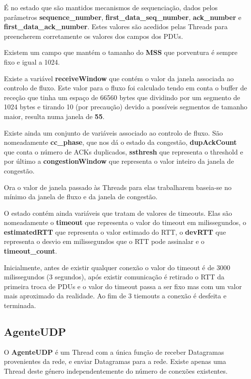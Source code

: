 \documentclass{llncs}
\begin{document}
É no estado que são mantidos mecanismos de sequenciação, dados pelos parâmetros \textbf{sequence\_number}, \textbf{first\_data\_seq\_number}, \textbf{ack\_number} e \textbf{first\_data\_ack\_number}. Estes valores são acedidos pelas Threads para preencherem corretamente os valores dos campos dos PDUs.

Existem um campo que mantém o tamanho do \textbf{MSS} que porventura é sempre fixo e igual a 1024.

Existe a variável \textbf{receiveWindow} que contém o valor da janela associada ao controlo de fluxo. Este valor para o fluxo foi calculado tendo em conta o buffer de receção que tinha um espaço de 66560 bytes que dividindo por um segmento de 1024 bytes e tirando 10 (por precaução) devido a possíveis segmentos de tamanho maior, resulta numa janela de \textbf{55}.

Existe ainda um conjunto de variáveis associado ao controlo de fluxo. São nomeadamente \textbf{cc\_phase}, que nos dá o estado da congestão, \textbf{dupAckCount} que conta o número de ACKs duplicados, \textbf{ssthresh} que representa o threshold e por último a \textbf{congestionWindow} que representa o valor inteiro da janela de congestão.

Ora o valor de janela passado às Threads para elas trabalharem baseia-se no mínimo da janela de fluxo e da janela de congestão.

O estado contém ainda variáveis que tratam de valores de timeouts. Elas são nomeadamente o \textbf{timeout} que representa o valor do timeout em milissegundos, o \textbf{estimatedRTT} que representa o valor estimado do RTT, o \textbf{devRTT} que representa o desvio em milissegundos que o RTT pode assinalar e o \textbf{timeout\_count}.

Inicialmente, antes de existir qualquer conexão o valor do timeout é de 3000 milissegundos (3 segundos),  após existir comunicação é retirado o RTT da primeira troca de PDUs e o valor do timeout passa a ser fixo mas com um valor mais aproximado da realidade. Ao fim de 3 tiemouts a conexão é desfeita e terminada.



\subsection{AgenteUDP}

O \textbf{AgenteUDP} é um Thread com a única função de receber Datagramas provenientes da rede, e enviar Datagramas para a rede. Existe apenas uma Thread deste género independentemente do número de conexões existentes.
\end{document}
